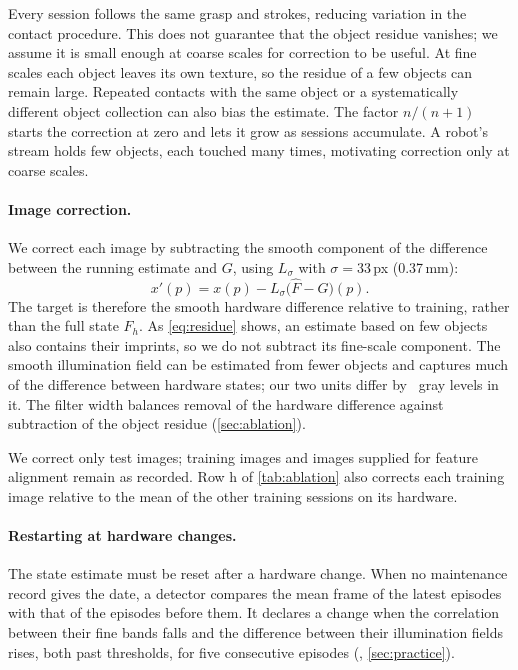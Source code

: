 Every session follows the same grasp and strokes, reducing variation in the contact procedure. This does not guarantee that the object residue vanishes; we assume it is small enough at coarse scales for correction to be useful. At fine scales each object leaves its own texture, so the residue of a few objects can remain large. Repeated contacts with the same object or a systematically different object collection can also bias the estimate. The factor $n/(n+1)$ starts the correction at zero and lets it grow as sessions accumulate. A robot's stream holds few objects, each touched many times, motivating correction only at coarse scales.

\paragraph{Image correction.}
We correct each image by subtracting the smooth component of the difference between the running estimate and $G$, using $L_\sigma$ with $\sigma = 33$\,px (0.37\,mm):
\begin{equation}
x'(p) = x(p) - L_\sigma\big(\hat F - G\big)(p).
\label{eq:correction}
\end{equation}
The target is therefore the smooth hardware difference relative to training, rather than the full state $F_h$. As \cref{eq:residue} shows, an estimate based on few objects also contains their imprints, so we do not subtract its fine-scale component. The smooth illumination field can be estimated from fewer objects and captures much of the difference between hardware states; our two units differ by \LpDistSoneStwo\ gray levels in it. The filter width balances removal of the hardware difference against subtraction of the object residue (\cref{sec:ablation}).

We correct only test images; training images and images supplied for feature alignment remain as recorded. Row h of \cref{tab:ablation} also corrects each training image relative to the mean of the other training sessions on its hardware.

\paragraph{Restarting at hardware changes.}
The state estimate must be reset after a hardware change. When no maintenance record gives the date, a detector compares the mean frame of the latest episodes with that of the episodes before them. It declares a change when the correlation between their fine bands falls and the difference between their illumination fields rises, both past thresholds, for five consecutive episodes (, \cref{sec:practice}).

